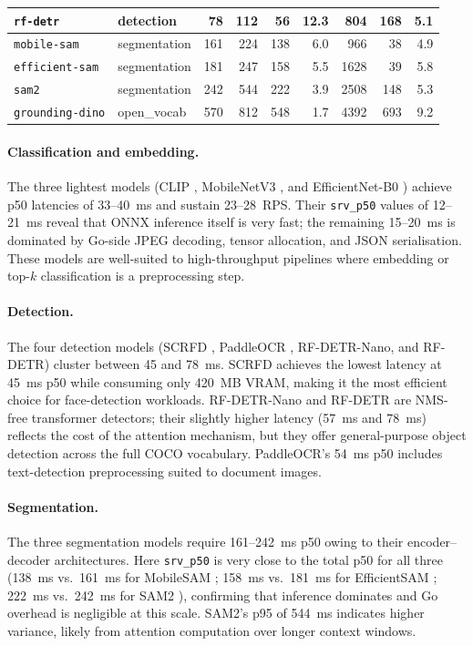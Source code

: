 \begin{table}[t]
\begin{tabular}{llrrrrrrr}
    \texttt{rf-detr}       & detection      &  78 & 112 &  56 & 12.3 &  804 & 168 & 5.1 \\
    \midrule
    \texttt{mobile-sam}    & segmentation   & 161 & 224 & 138 &  6.0 &  966 &  38 & 4.9 \\
    \texttt{efficient-sam} & segmentation   & 181 & 247 & 158 &  5.5 & 1628 &  39 & 5.8 \\
    \texttt{sam2}          & segmentation   & 242 & 544 & 222 &  3.9 & 2508 & 148 & 5.3 \\
    \texttt{grounding-dino}& open\_vocab    & 570 & 812 & 548 &  1.7 & 4392 & 693 & 9.2 \\
    \bottomrule
  \end{tabular}
\end{table}

\paragraph{Classification and embedding.}
The three lightest models (CLIP \cite{radford2021clip}, MobileNetV3
\cite{howard2019mobilenetv3}, and EfficientNet-B0 \cite{tan2019efficientnet}) achieve
p50 latencies of 33--40~ms and sustain 23--28~RPS.  Their \texttt{srv\_p50} values of
12--21~ms reveal that ONNX inference itself is very fast; the remaining 15--20~ms is
dominated by Go-side JPEG decoding, tensor allocation, and JSON serialisation.  These
models are well-suited to high-throughput pipelines where embedding or top-$k$
classification is a preprocessing step.

\paragraph{Detection.}
The four detection models (SCRFD \cite{guo2021scrfd}, PaddleOCR \cite{du2020ppocr},
RF-DETR-Nano, and RF-DETR) cluster between 45 and 78~ms.  SCRFD achieves the lowest
latency at 45~ms p50 while consuming only 420~MB VRAM, making it the most efficient
choice for face-detection workloads.  RF-DETR-Nano and RF-DETR
are NMS-free transformer detectors; their slightly higher latency (57~ms and 78~ms)
reflects the cost of the attention mechanism, but they offer general-purpose
object detection across the full COCO vocabulary.  PaddleOCR's 54~ms p50 includes
text-detection preprocessing suited to document images.

\paragraph{Segmentation.}
The three segmentation models require 161--242~ms p50 owing to their encoder--decoder
architectures.  Here \texttt{srv\_p50} is very close to the total p50 for all three
(138~ms vs.\ 161~ms for MobileSAM \cite{zhang2023mobilesam}; 158~ms vs.\ 181~ms for
EfficientSAM \cite{xiong2023efficientsam}; 222~ms vs.\ 242~ms for SAM2
\cite{ravi2024sam2}), confirming that inference dominates and Go overhead is negligible
at this scale.  SAM2's p95 of 544~ms indicates higher variance, likely from attention
computation over longer context windows.

